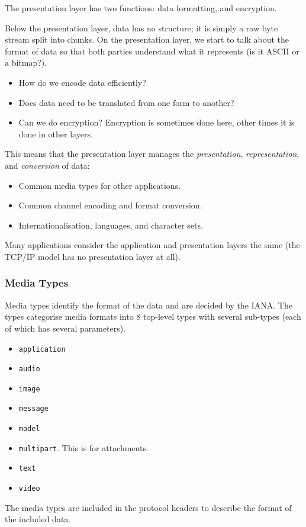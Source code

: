 The presentation layer has two functions: data formatting, and encryption.

Below the presentation layer, data has no structure; it is simply a raw byte stream split into chunks.
On the presentation layer, we start to talk about the format of data so that both parties understand what it represents (is it ASCII or a bitmap?).
\begin{itemize}
	\item How do we encode data efficiently?
	\item Does data need to be translated from one form to another?
	\item Can we do encryption?
	      Encryption is sometimes done here, other times it is done in other layers.
\end{itemize}
This means that the presentation layer manages the \emph{presentation}, \emph{representation}, and \emph{conversion} of data:
\begin{itemize}
	\item Common media types for other applications.
	\item Common channel encoding and format conversion.
	\item Internationalisation, languages, and character sets.
\end{itemize}
Many applications consider the application and presentation layers the same (the TCP/IP model has no presentation layer at all).

\subsubsection{Media Types}\label{ssub:media_types}

Media types identify the format of the data and are decided by the IANA.
The types categorise media formats into \(8\) top-level types with several sub-types (each of which has several parameters).
\begin{itemize}
	\item \texttt{application}
	\item \texttt{audio}
	\item \texttt{image}
	\item \texttt{message}
	\item \texttt{model}
	\item \texttt{multipart}. This is for attachments.
	\item \texttt{text}
	\item \texttt{video}
\end{itemize}
\begin{note}
	The media types are included in the protocol headers to describe the format of the included data.
\end{note}

